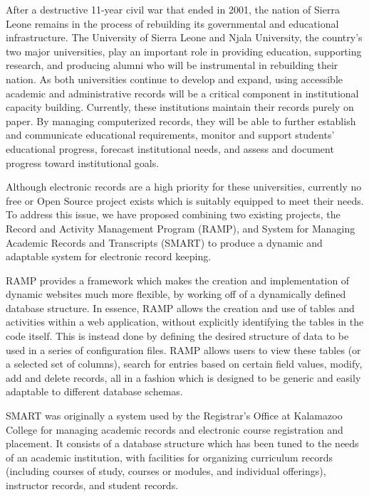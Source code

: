 \documentclass[12pt]{article}
\begin{document}
After a destructive 11-year civil war that ended in 2001, the nation of Sierra Leone remains in the process of rebuilding its governmental and educational infrastructure. The University of Sierra Leone and Njala University, the country's two major universities, play an important role in providing education, supporting research, and producing alumni who will be instrumental in rebuilding their nation. As both universities continue to develop and expand, using accessible academic and administrative records will be a critical component in institutional capacity building. Currently, these institutions maintain their records purely on paper. By managing computerized records, they will be able to further establish and communicate educational requirements, monitor and support students' educational progress, forecast institutional needs, and assess and document progress toward institutional goals.

Although electronic records are a high priority for these universities, currently no free or Open Source project exists which is suitably equipped to meet their needs. To address this issue, we have proposed combining two existing projects, the Record and Activity Management Program (RAMP), and System for Managing Academic Records and Transcripts (SMART) to produce a dynamic and adaptable system for electronic record keeping.

RAMP provides a framework which makes the creation and implementation of dynamic websites much more flexible, by working off of a dynamically defined database structure. In essence, RAMP allows the creation and use of tables and activities within a web application, without explicitly identifying the tables in the code itself. This is instead done by defining the desired structure of data to be used in a series of configuration files. RAMP allows users to view these tables (or a selected set of columns), search for entries based on certain field values, modify, add and delete records, all in a fashion which is designed to be generic and easily adaptable to different database schemas.

SMART was originally a system used by the Registrar's Office at Kalamazoo College for managing academic records and electronic course registration and placement. It consists of a database structure which has been tuned to the needs of an academic institution, with facilities for organizing curriculum records (including courses of study, courses or modules, and individual offerings), instructor records, and student records.
\end{document}
